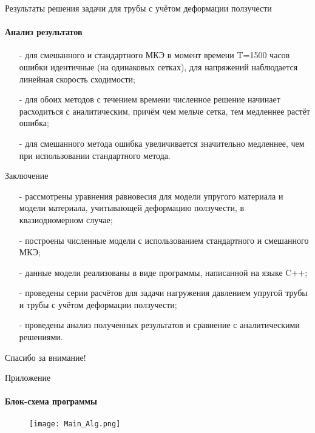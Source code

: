\documentclass{beamer}
\begin{document}
\begin{frame}{Результаты решения задачи для трубы с учётом деформации ползучести}
\framesubtitle{Анализ результатов}
\small
\begin{itemize}
\item[-]для смешанного и стандартного МКЭ в момент времени T=1500 часов ошибки идентичные (на одинаковых сетках), для напряжений наблюдается линейная скорость сходимости;
\medskip
\item[-]для обоих методов с течением времени численное решение начинает расходиться с аналитическим, причём чем мельче сетка, тем медленнее растёт ошибка;
\medskip
\item[-]для смешанного метода ошибка увеличивается значительно медленнее, чем при использовании стандартного метода.
\end{itemize}
\end{frame}

\begin{frame}{Заключение}
\small
\begin{itemize}
\item[-]рассмотрены уравнения равновесия для модели упругого материала и модели материала, учитывающей деформацию ползучести, в квазиодномерном случае;
\medskip
\item[-]построены численные модели с использованием стандартного и смешанного МКЭ;
\medskip
\item[-]данные модели реализованы в виде программы, написанной на языке C++;
\medskip
\item[-]проведены серии расчётов для задачи нагружения давлением упругой трубы и трубы с учётом деформации ползучести;
\medskip
\item[-]проведены анализ полученных результатов и сравнение с аналитическими решениями.
\end{itemize}
\end{frame}

\begin{frame}{Спасибо за внимание!}

\end{frame}

\begin{frame}{Приложение}
\framesubtitle{Блок-схема программы}
\begin{figure}
\centering
\texttt{[image: Main\_Alg.png]}
\end{figure}
\end{frame}
\end{document}
